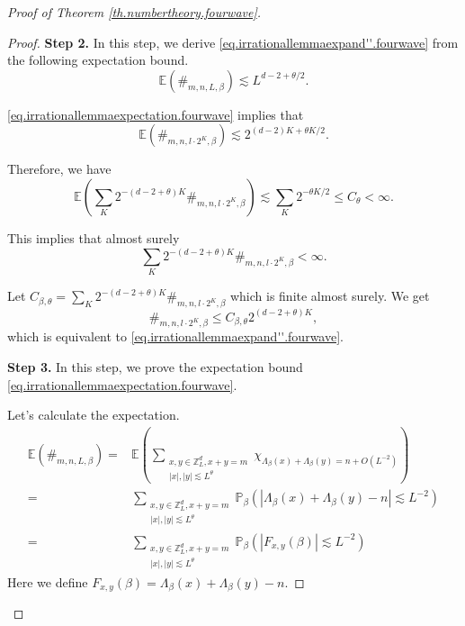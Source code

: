 \begin{proof}[Proof of Theorem \ref{th.numbertheory.fourwave}]
\begin{proof}
\textbf{Step 2.} In this step, we derive \eqref{eq.irrationallemmaexpand''.fourwave} from the following expectation bound.
\begin{equation}\label{eq.irrationallemmaexpectation.fourwave}
    \mathbb{E}(\#_{m,n,L,\beta})\lesssim L^{d-2+\theta/2}.
\end{equation}

\eqref{eq.irrationallemmaexpectation.fourwave} implies that
\begin{equation}\label{eq.irrationallemmaexpectation'.fourwave}
    \mathbb{E}(\#_{m,n,l\cdot 2^K,\beta})\lesssim 2^{(d-2)K+\theta K/2}.
\end{equation}

Therefore, we have
\begin{equation}
    \mathbb{E}\left(\sum_{K} 2^{-(d-2+\theta)K}\#_{m,n,l\cdot 2^K,\beta}\right)\lesssim \sum_K 2^{-\theta K/2}\le C_{\theta}<\infty.
\end{equation}

This implies that almost surely
\begin{equation}
    \sum_{K} 2^{-(d-2+\theta)K}\#_{m,n,l\cdot 2^K,\beta}<\infty.
\end{equation}

Let $C_{\beta,\theta}=\sum_{K} 2^{-(d-2+\theta)K}\#_{m,n,l\cdot 2^K,\beta}$ which is finite almost surely. We get 
\begin{equation}
    \#_{m,n,l\cdot 2^K,\beta}\le C_{\beta,\theta} 2^{(d-2+\theta)K},
\end{equation}
which is equivalent to \eqref{eq.irrationallemmaexpand''.fourwave}.

\textbf{Step 3.} In this step, we prove the expectation bound \eqref{eq.irrationallemmaexpectation.fourwave}.

Let's calculate the expectation.
\begin{equation}\label{eq.irrationallemmastep2.fourwave}
\begin{split}
    \mathbb{E}(\#_{m,n,L,\beta})=&\mathbb{E}\left(\sum_{\substack{x,y\in\mathbb{Z}^d_L,x+y=m \\ |x|,|y|\lesssim L^{\theta}}} \chi_{\Lambda_{\beta}(x)+\Lambda_{\beta}(y)=n+O(L^{-2})}\right)
    \\
    =&\sum_{\substack{x,y\in\mathbb{Z}^d_L,x+y=m \\ |x|,|y|\lesssim L^{\theta}}} \mathbb{P}_{\beta}(|\Lambda_{\beta}(x)+\Lambda_{\beta}(y)-n|\lesssim L^{-2})
    \\
    =&\sum_{\substack{x,y\in\mathbb{Z}^d_L,x+y=m \\ |x|,|y|\lesssim L^{\theta}}} \mathbb{P}_{\beta}(|F_{x,y}(\beta)|\lesssim L^{-2})
\end{split}
\end{equation}
Here we define $F_{x,y}(\beta)=\Lambda_{\beta}(x)+\Lambda_{\beta}(y)-n$.


\end{proof}
\end{proof}
